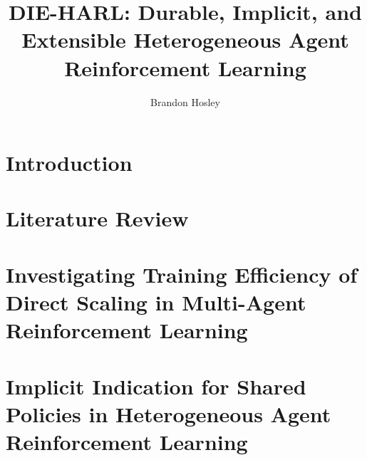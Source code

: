 \documentclass[style=nature,dvipsnames]{afitthesis}
\title{
    DIE-HARL: Durable, Implicit, and Extensible 
    Heterogeneous Agent Reinforcement Learning
}
\author{Brandon Hosley}
\begin{document}
\setcounter{tocdepth}{1} %

\chapter{Introduction}%
\label{ch:introduction}


\chapter{Literature Review}%
\label{ch:literature_review}


\chapter[Investigating Training Efficiency of Direct Scaling]{
    Investigating Training Efficiency of Direct Scaling in Multi-Agent Reinforcement Learning
}%
\label{ch:contribution_1}


\chapter[Implicit Indication for Shared Policies]{
    Implicit Indication for Shared Policies in Heterogeneous Agent Reinforcement Learning
}%
\label{ch:contribution_2}


\end{document}
